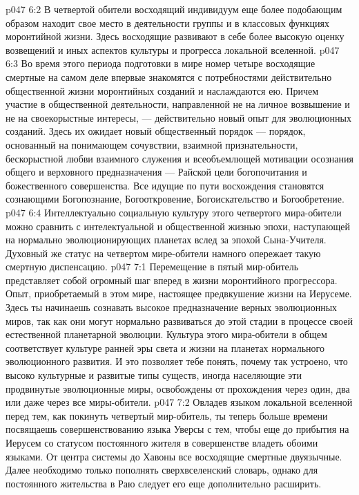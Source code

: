 \vs p047 6:2 В четвертой обители восходящий индивидуум еще более подобающим образом находит свое место в деятельности группы и в классовых функциях моронтийной жизни. Здесь восходящие развивают в себе более высокую оценку возвещений и иных аспектов культуры и прогресса локальной вселенной.
\vs p047 6:3 Во время этого периода подготовки в мире номер четыре восходящие смертные на самом деле впервые знакомятся с потребностями действительно общественной жизни моронтийных созданий и наслаждаются ею. Причем участие в общественной деятельности, направленной не на личное возвышение и не на своекорыстные интересы, --- действительно новый опыт для эволюционных созданий. Здесь их ожидает новый общественный порядок --- порядок, основанный на понимающем сочувствии, взаимной признательности, бескорыстной любви взаимного служения и всеобъемлющей мотивации осознания общего и верховного предназначения --- Райской цели богопочитания и божественного совершенства. Все идущие по пути восхождения становятся сознающими Богопознание, Богооткровение, Богоискательство и Богообретение.
\vs p047 6:4 Интеллектуально социальную культуру этого четвертого мира\hyp{}обители можно сравнить с интелектуальной и общественной жизнью эпохи, наступающей на нормально эволюционирующих планетах вслед за эпохой Сына\hyp{}Учителя. Духовный же статус на четвертом мире\hyp{}обители намного опережает такую смертную диспенсацию.
\vs p047 7:1 Перемещение в пятый мир\hyp{}обитель представляет собой огромный шаг вперед в жизни моронтийного прогрессора. Опыт, приобретаемый в этом мире, настоящее предвкушение жизни на Иерусеме. Здесь ты начинаешь сознавать высокое предназначение верных эволюционных миров, так как они могут нормально развиваться до этой стадии в процессе своей естественной планетарной эволюции. Культура этого мира\hyp{}обители в общем соответствует культуре ранней эры света и жизни на планетах нормального эволюционного развития. И это позволяет тебе понять, почему так устроено, что высоко культурные и развитые типы существ, иногда населяющие эти продвинутые эволюционные миры, освобождены от прохождения через один, два или даже через все миры\hyp{}обители.
\vs p047 7:2 Овладев языком локальной вселенной перед тем, как покинуть четвертый мир\hyp{}обитель, ты теперь больше времени посвящаешь совершенствованию языка Уверсы с тем, чтобы еще до прибытия на Иерусем со статусом постоянного жителя в совершенстве владеть обоими языками. От центра системы до Хавоны все восходящие смертные двуязычные. Далее необходимо только пополнять сверхвселенский словарь, однако для постоянного жительства в Раю следует его еще дополнительно расширить.
